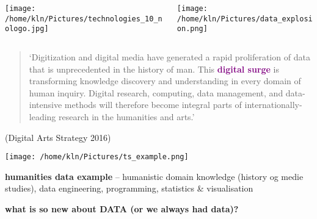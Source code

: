 \documentclass[8pt]{beamer}
\begin{document}
\begin{frame}{}
\begin{columns}
\begin{column}{0.5\textwidth}
	\begin{center}
		\texttt{[image: /home/kln/Pictures/technologies\_10\_nologo.jpg]}     	
     \end{center}
\end{column}
\begin{column}{0.5\textwidth}
    \begin{center}
     	\texttt{[image: /home/kln/Pictures/data\_explosion.png]}
    \end{center}
\end{column}
\end{columns}
\bigskip 
\bigskip
\small
\begin{quote}
`Digitization and digital media have generated a rapid proliferation of data that is unprecedented in the history of man. This \textcolor{purple}{\textbf{digital surge}} is transforming knowledge discovery and understanding in every domain of human inquiry. Digital research, computing, data management, and data-intensive methods will therefore become integral parts of internationally-leading research in the humanities and arts.'
\end{quote}
\begin{flushright}
(Digital Arts Strategy 2016)
\end{flushright}
\end{frame}

\begin{frame}%
	\begin{center}
		\texttt{[image: /home/kln/Pictures/ts\_example.png]}
	\end{center}
	\small \textbf{humanities data example}
	 -- humanistic domain knowledge (history og medie studies), data engineering, programming, statistics \& visualisation\\
\end{frame}

\begin{frame}
	\begin{center}
		\textbf{what is so new about DATA (or we always had data)?}
	\end{center}
\end{frame}
\end{document}
